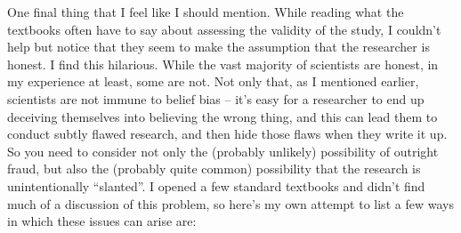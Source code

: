 \documentclass[
]{book}
\begin{document}
One final thing that I feel like I should mention. While reading what the textbooks often have to say about assessing the validity of the study, I couldn't help but notice that they seem to make the assumption that the researcher is honest. I find this hilarious. While the vast majority of scientists are honest, in my experience at least, some are not. Not only that, as I mentioned earlier, scientists are not immune to belief bias -- it's easy for a researcher to end up deceiving themselves into believing the wrong thing, and this can lead them to conduct subtly flawed research, and then hide those flaws when they write it up. So you need to consider not only the (probably unlikely) possibility of outright fraud, but also the (probably quite common) possibility that the research is unintentionally ``slanted''. I opened a few standard textbooks and didn't find much of a discussion of this problem, so here's my own attempt to list a few ways in which these issues can arise are:
\end{document}
